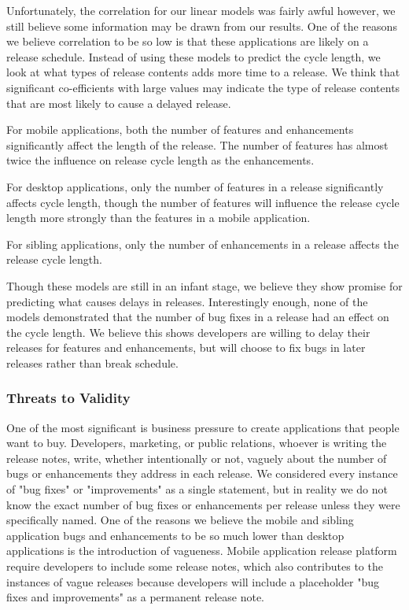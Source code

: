 \documentclass{acm_proc_article-sp}
\begin{document}
\begin{center}

\label{tab:sibModel}
\end{center}

Unfortunately, the correlation for our linear models was fairly awful however, we still believe some information may be drawn from our results.
One of the reasons we believe correlation to be so low is that these applications are likely on a release schedule.
Instead of using these models to predict the cycle length, we look at what types of release contents adds more time to a release.
We think that significant co-efficients with large values may indicate the type of release contents that are most likely to cause a delayed release. 

For mobile applications, both the number of features and enhancements significantly affect the length of the release.
The number of features has almost twice the influence on release cycle length as the enhancements. 

For desktop applications,  only the number of features in a release significantly affects cycle length, though the number of features will influence the release cycle length more strongly than the features in a mobile application.

For sibling applications, only the number of enhancements in a release affects the release cycle length.

Though these models are still in an infant stage, we believe they show promise for predicting what causes delays in releases.
Interestingly enough, none of the models demonstrated that the number of bug fixes in a release had an effect on the cycle length.
We believe this shows developers are willing to delay their releases for features and enhancements, but will choose to fix bugs in later releases rather than break schedule.


\subsubsection{Threats to Validity}

One of the most significant is business pressure to create applications that people want to buy.
Developers, marketing, or public relations, whoever is writing the release notes, write, whether intentionally or not, vaguely about the number of bugs or enhancements they address in each release. 
We considered every instance of "bug fixes" or "improvements" as a single statement, but in reality we do not know the exact number of bug fixes or enhancements per release unless they were specifically named.
One of the reasons we believe the mobile and sibling application bugs and enhancements to be so much lower than desktop applications is the introduction of vagueness.
Mobile application release platform require developers to include some release notes, which also contributes to the instances of vague releases because developers will include a placeholder "bug fixes and improvements" as a permanent release note.
\end{document}
